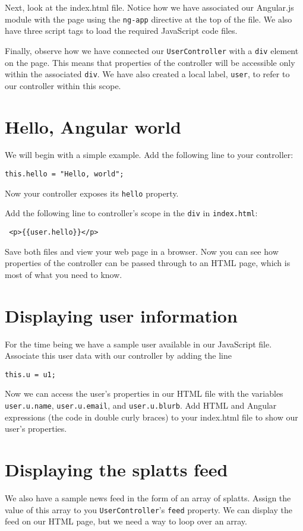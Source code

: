\documentclass{article}
\begin{document}
Next, look at the index.html file.  Notice how we have associated our Angular.js module with the page using the \texttt{ng-app} directive at the top of the file.  We also have three script tags to load the required JavaScript code files.

Finally, observe how we have connected our \texttt{UserController} with a \texttt{div} element on the page.  This means that properties of the controller will be accessible only within the associated \texttt{div}.  We have also created a local label, \texttt{user}, to refer to our controller within this scope.

\section{Hello, Angular world}
We will begin with a simple example. Add the following line to your controller:

\texttt{this.hello = "Hello, world";}

Now your controller exposes its \texttt{hello} property.

Add the following line to controller's scope in the \texttt{div} in \texttt{index.html}:

\texttt{ <p>\{\{user.hello\}\}</p> }

Save both files and view your web page in a browser. Now you can see how properties of the controller can be passed through to an HTML page, which is most of what you need to know.

\section{Displaying user information}
For the time being we have a sample user available in our JavaScript file.  Associate this user data with our controller by adding the line

\texttt{this.u = u1;}

Now we can access the user's properties in our HTML file with the variables \texttt{user.u.name}, \texttt{user.u.email}, and \texttt{user.u.blurb}.  Add HTML and Angular expressions (the code in double curly braces) to your index.html file to show our user's properties.

\section{Displaying the splatts feed}
We also have a sample news feed in the form of an array of splatts.  Assign the value of this array to you \texttt{UserController}'s \texttt{feed} property.  We can display the feed on our HTML page, but we need a way to loop over an array.
\end{document}
